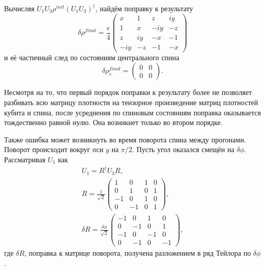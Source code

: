 \documentclass[a4paper,12pt]{article}
\theoremstyle{plain} %
\theoremstyle{definition} %
\theoremstyle{remark} %
\begin{document}
Вычисляя $U_1 U_3 \rho^{init} (U_1 U_3)^\dagger$, найдём поправку к результату
\begin{equation}
    \delta \rho^{final} = \frac{\epsilon}{4}
    \begin{pmatrix}
        x & 1 & z & i y \\
        1 & x & - i y & -z \\
        z & i y & -x & -1 \\
        - i y & - z & -1 & -x
    \end{pmatrix}
\end{equation}
и её частичный след по состояниям центрального спина
\begin{equation}
    \delta \rho^{final}_\tau = 
    \begin{pmatrix}
        0 & 0 \\
        0 & 0
    \end{pmatrix}.
\end{equation}

Несмотря на то, что первый порядок поправки к результату более не позволяет разбивать всю матрицу плотности на тензорное произведение матриц плотностей кубита и спина, после усреднения по спиновым состояниям поправка оказывается тождественно равной нулю. Она возникнет только во втором порядке.

Также ошибка может возникнуть во время поворота спина между прогонами. Поворот происходит вокруг оси $y$ на $\pi/2$. Пусть угол оказался смещён на $\delta \phi$. Рассматривая $U_1$ как
\begin{gather}
    U_1 = R^\dagger U_3 R,
    \\
    R = \frac{1}{\sqrt{2}}
    \begin{pmatrix}
        1 & 0 & 1 & 0 \\
        0 & 1 & 0 & 1 \\
        -1 & 0 & 1 & 0 \\
        0 & -1 & 0 & 1
    \end{pmatrix},
    \\
    \delta R = \frac{\delta \phi}{\sqrt{2}}
    \begin{pmatrix}
        -1 & 0 & 1 & 0 \\
        0 & -1 & 0 & 1 \\
        -1 & 0 & -1 & 0 \\
        0 & -1 & 0 & -1
    \end{pmatrix},
\end{gather}
где $\delta R$, поправка к матрице поворота, получена разложением в ряд Тейлора по $\delta \phi$.
\end{document}
